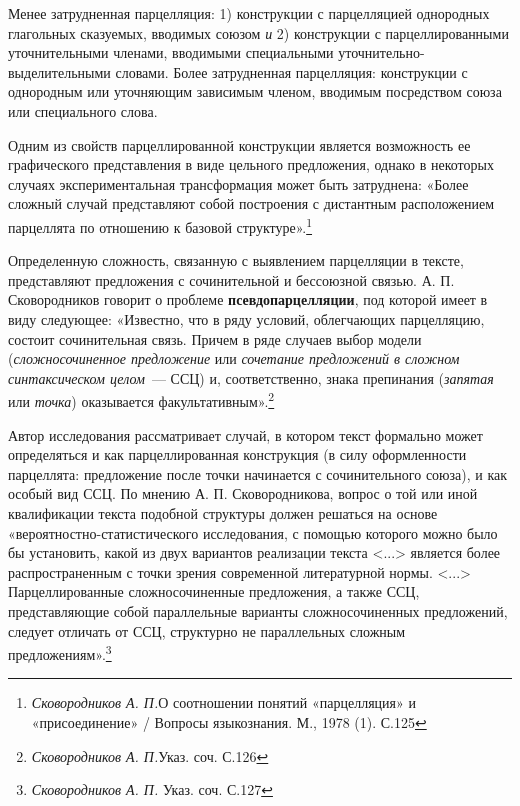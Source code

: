 \documentclass{kursa4}
\begin{document}
{      Менее затрудненная парцелляция: 1) конструкции с
      парцелляцией однородных глагольных сказуемых, вводимых союзом
      \textit{и }2) конструкции с
      парцеллированными уточнительными членами, вводимыми специальными
      уточнительно-выделительными словами. Более затрудненная парцелляция: конструкции с однородным или уточняющим зависимым
      членом, вводимым посредством союза или специального слова.

      Одним из свойств парцеллированной конструкции является возможность ее графического представления в виде цельного
      предложения, однако в некоторых случаях экспериментальная трансформация
      может быть затруднена: «Более сложный случай представляют собой построения с дистантным расположением парцеллята по отношению к базовой структуре».\footnote{\textit{{ Сковородников А. П.}}{О соотношении понятий «парцелляция» и «присоединение» / Вопросы языкознания. М., 1978 (1). С.125}}

      Определенную сложность, связанную с выявлением парцелляции в тексте, представляют
      предложения с сочинительной и бессоюзной связью. А. П. Сковородников
      говорит о проблеме \textbf{псевдопарцелляции}, под которой имеет в виду следующее: «Известно, что в ряду условий, облегчающих парцелляцию, состоит сочинительная связь. Причем в ряде случаев выбор модели (\textit{сложносочиненное предложение} или \textit{сочетание предложений в сложном синтаксическом целом}{~--- ССЦ) и, соответственно, знака препинания (}\textit{запятая} или \textit{точка}) оказывается факультативным».\footnote{\textit{Сковородников А. П.}{Указ. соч. С.126}}

      Автор исследования рассматривает случай, в котором текст формально может определяться и как парцеллированная конструкция (в силу оформленности парцеллята: предложение после точки начинается с сочинительного союза), и как особый вид ССЦ. По мнению А. П.
      Сковородникова, вопрос о той или иной квалификации текста подобной
      структуры должен решаться на основе «вероятностно-статистического
      исследования, с помощью которого можно было бы установить, какой из
      двух вариантов реализации текста \textless{}...\textgreater{} является
      более распространенным с точки зрения современной литературной нормы.
      \textless{}...\textgreater{} Парцеллированные сложносочиненные
      предложения, а также ССЦ, представляющие собой параллельные варианты
      сложносочиненных предложений, следует отличать от
      {ССЦ, структурно не параллельных сложным
      предложениям}{».}\footnote{\textit{{
      Сковородников А. П. }}{Указ. соч.
      С.127}}{ }

}
\end{document}

